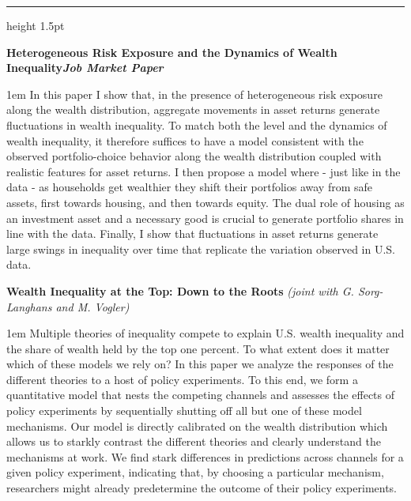 \documentclass{resume} %
\renewenvironment{abstract}{\begin{adjustwidth}{1em}{}}{\end{adjustwidth}}
\newcommand\cinzel[1]{{\scfamily #1}}
\renewenvironment{rSection}[1]{
\sectionskip
{\color{accent_dark}\textsb{\cinzel{\Large{\textsc{#1}}}}}
\normalsize
\sectionlineskip
{\color{accent_dark}\vspace{-2.5pt}\hrule height 1.5pt}
\begin{list}{}{
\setlength{\leftmargin}{1.5em}
}
\item[]
}{
\end{list}
}
\begin{document}
\begin{rSection}{Working Papers}

{\sc \textbf{Heterogeneous Risk Exposure and the Dynamics of Wealth Inequality}}\hfill {\footnotesize \em \textbf{Job Market Paper}} \\[-1.5em]
{\begin{abstract}
    \footnotesize 
    In this paper I show that, in the presence of heterogeneous risk exposure along the wealth distribution, aggregate movements in asset returns generate fluctuations in wealth inequality.
    To match both the level and the dynamics of wealth inequality, it therefore suffices to have a model consistent with the observed portfolio-choice behavior along the wealth distribution coupled with realistic features for asset returns.
    I then propose a model where - just like in the data - as households get wealthier they shift their portfolios away from safe assets, first towards housing, and then towards equity.
    The dual role of housing as an investment asset and a necessary good is crucial to generate portfolio shares in line with the data.
    Finally, I show that fluctuations in asset returns generate large swings in inequality over time that replicate the variation observed in U.S. data.
\end{abstract}}
\vspace*{0.5em}
{{\sc \textbf{Wealth Inequality at the Top: Down to the Roots}} \hfill {\footnotesize \em (joint with G. Sorg-Langhans and M. Vogler)}} \\[-1.5em]
{\begin{abstract}
    \footnotesize
    Multiple theories of inequality compete to explain U.S. wealth inequality and the share of wealth held by the top one percent. To what extent does it matter which of these models we rely on? In this paper we analyze the responses of the different theories to a host of policy experiments. 
    To this end, we form a quantitative model that nests the competing channels and assesses the effects of policy experiments by sequentially shutting off all but one of these model mechanisms. Our model is directly calibrated on the wealth distribution which allows us to starkly contrast the different theories and clearly understand the mechanisms at work. We find stark differences in predictions across channels for a given policy experiment, indicating that, by choosing a particular mechanism, researchers might already predetermine the outcome of their policy experiments.
\end{abstract}}
\vspace*{0.5em}

\end{rSection}\vspace*{-1.5ex}
\end{document}
